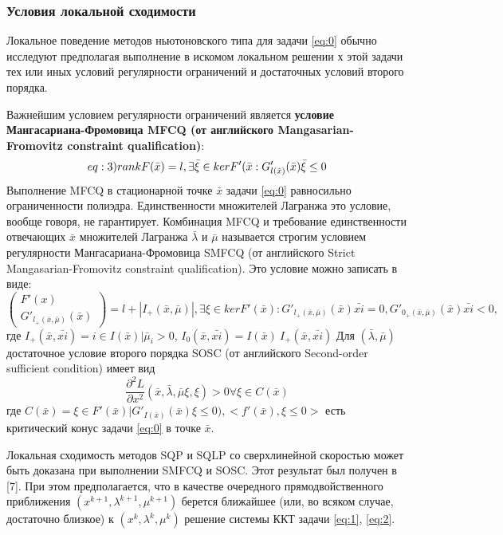 \documentclass[12pt,a4paper]{article}
\begin{document}
	\subsubsection{Условия локальной сходимости}
	Локальное поведение методов ньютоновского типа для задачи \ref{eq:0} обычно исследуют предполагая выполнение в искомом локальном решении $х$ этой задачи тех или иных условий регулярности ограничений и достаточных условий второго порядка.
	
	Важнейшим условием регулярности ограничений является \textbf{условие Мангасариана-Фромовица MFCQ (от английского Mangasarian-Fromovitz constraint qualification)}:
	\begin{align*}\label(eq:3)
		rankF(\bar{x}) = l, \exists\bar\xi \in kerF'(\bar{x} : G'_{l(\bar{x})}(\bar{x})\bar{\xi} \leq 0 
	\end{align*}
	Выполнение MFCQ в стационарной точке $\bar{x}$ задачи \ref{eq:0} равносильно ограниченности полиэдра. Единственности множителей Лагранжа это условие, вообще говоря, не гарантирует. Комбинация MFCQ и требование единственности отвечающих $\bar{x}$ множителей Лагранжа $\bar{\lambda}$ и $\bar{\mu}$ называется строгим условием регулярности Мангасариана-Фромовица SMFCQ (от английского Strict
	Mangasarian-Fromovitz constraint qualification). Это условие можно записать в виде:
	\begin{equation}
		\begin{pmatrix}
		F'(x)\\
			G'_{l_{+}(\bar{x}, \bar{\mu})}(\bar{x})
		\end{pmatrix} = l + |I_{+}(\bar{x}, \bar{\mu})|,
	\exists \xi \in kerF'(\bar{x}): 	G'_{l_{+}(\bar{x}, \bar{\mu})}(\bar{x})\bar{xi} = 0, 	G'_{0_{+}(\bar{x}, \bar{\mu})}(\bar{x})\bar{xi} < 0,
	\end{equation}
где 
$I_+(\bar{x},\bar{xi}) = {i \in I(\bar{x})|\bar{\mu}_i > 0}$, 
$ I_0(\bar{x},\bar{xi}) = I(\bar{x}) \ I_+(\bar{x},\bar{xi})$	
	Для $(\bar{\lambda}, \bar{\mu})$ достаточное условие второго порядка SOSC (от английского Second-order
	sufficient condition) имеет вид
	\begin{equation}
		\frac{\partial^2 L}{\partial x^2}(\bar{x}, \bar{\lambda}, \bar{\mu}\xi, \xi) > 0 \forall\xi \in C(\bar{x})	
	\end{equation}	 
	где $C(\bar{x}) = {\xi \in F'(\bar{x})|G'_{I(\bar{x})}(\bar{x})\xi \leq 0)}, <f'(\bar{x}), \xi\leq 0>$ есть критический конус задачи \ref{eq:0} в точке $\bar{x}$.
	
	
Локальная сходимость методов SQP и SQLP со сверхлинейной скоростью может быть доказана при выполнении SMFCQ и SOSC. Этот результат был получен
в [7]. При этом предполагается, что в качестве очередного прямодвойственного приближения $(x^{k+1},\lambda^{k+1}, \mu^{k+1})$ берется ближайшее (или, во всяком случае, достаточно
близкое) к $(x^{k},\lambda^{k}, \mu^{k})$ решение системы ККТ задачи \ref{eq:1}, \ref{eq:2}.	
\end{document}
